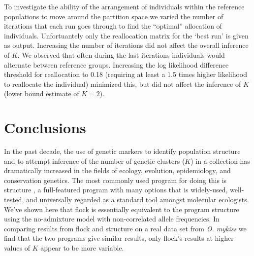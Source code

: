 
To investigate the ability of the arrangement of individuals within the reference 
populations to move around the partition space we varied the number of iterations that 
each run goes through to find the ``optimal'' allocation of individuals. Unfortuantely 
only the reallocation matrix for the `best run' is given as output. Increasing the 
number of iterations did not affect the overall inference of $K$. We 
observed that often during the last iterations individuals would alternate between 
reference groups. Increasing the log likelihood 
difference threshold for reallocation to 0.18 (requiring at least a 1.5 times 
higher likelihood to reallocate the individual) minimized this, but did not affect the 
inference of $K$ (lower bound estimate of $K = 2$).

\section*{Conclusions}
In the past decade, the use of genetic markers to identify population structure and to attempt inference of
the number of genetic clusters ($K$) in a collection has dramatically increased in the fields of ecology, evolution, 
epidemiology, and conservation
genetics. The most commonly used program for doing this is {\sc structure} \citep{Pritchardetal2000,Falushetal2003}, 
a full-featured program with many options that is widely-used, well-tested, and universally regarded as a standard tool amongst molecular ecologists. 
We've shown here that {\sc flock} is essentially equivalent to the program {\sc structure} using the no-admixture model with non-correlated allele frequencies. In comparing results from {\sc flock} and {\sc structure} 
on a real data set from {\em O. mykiss} we find that the two programs give similar results, only {\sc flock}'s results at higher values of $K$ appear to be more variable.


